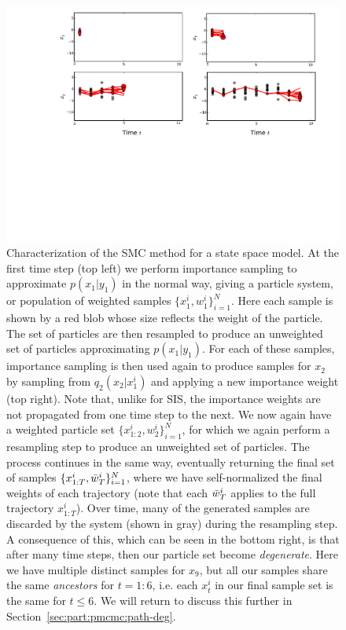 \begin{figure}[t]
	\centering 
	\includegraphics[width=\textwidth]{part/figures/smc_explan}
	\caption{Characterization of the SMC method for a state space model.  At the first time step (top left) 
		we perform importance sampling to approximate $p(x_1 | y_1)$ in the normal way, giving a particle system, or population
		of weighted samples $\{x_1^i,w_1^i\}_{i=1}^N$.  Here each sample is shown by a red blob whose size reflects the weight
		of the particle.  The set of particles are then resampled to produce an unweighted set of particles approximating
		$p(x_1 | y_1)$.  For each of these samples, importance sampling is then used again to produce samples for $x_2$
		by sampling from $q_2 (x_2 | x_1^i)$ and applying a new importance weight (top right).  Note that, unlike for SIS,
		the importance weights are not propagated from one time step to the next.
		We now again have a weighted particle set $\{x_{1:2}^i,w_2^i\}_{i=1}^N$, for which we again perform a resampling
		step to produce an unweighted set of particles.  The process continues in the same way, eventually returning the
		final set of samples $\{x_{1:T}^i,\bar w_T^i\}_{i=1}^N$, where we have self-normalized the final weights of each trajectory
		(note that each $\bar w_T^i$ applies to the full trajectory $x_{1:T}^i$).  
		Over time, many of the generated samples are
		discarded by the system (shown in gray) during the resampling step.  A consequence of this, which can be seen
		in the bottom right, is that after
		many time steps, then our particle set become \emph{degenerate}.  Here we have multiple distinct samples for $x_9$, but
		all our samples share the same \emph{ancestors} for $t=1:6$, i.e. each $x_t^i$ in our final sample set is
		the same for $t\le6$.  We will return to discuss this further in Section~\ref{sec:part:pmcmc:path-deg}.
		\label{fig:part:smc_explan}}
\end{figure}

